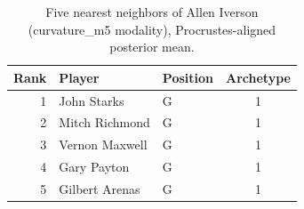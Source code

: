 \begin{table}[htbp]
  \centering\small
  \begin{tabular}{rllc}
    \toprule
    Rank & Player & Position & Archetype \\
    \midrule
    1 & John Starks & G & 1 \\
    2 & Mitch Richmond & G & 1 \\
    3 & Vernon Maxwell & G & 1 \\
    4 & Gary Payton & G & 1 \\
    5 & Gilbert Arenas & G & 1 \\
    \bottomrule
  \end{tabular}
  \caption{Five nearest neighbors of Allen Iverson (curvature_m5 modality), Procrustes-aligned posterior mean.}
  \label{tab:Allen_Iverson_neighbors_curvature_m5}
\end{table}

